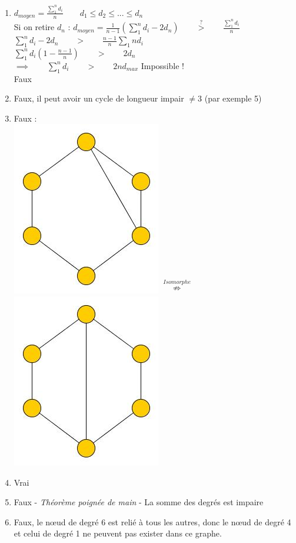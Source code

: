 \begin{solution}
\begin{enumerate}
\item{
$d_{moyen} = \frac{\sum_{1}^{n} d_{i}}{n} \qquad d_{1} \leq d_{2} \leq ... \leq d_{n}$\\
Si on retire $d_{n}$ :
$d_{moyen} = \frac{1}{n-1}  (\sum_{1}^{n} d_{i} -2d_{n}) \qquad \stackrel{?}{>} \qquad \frac{\sum_{1}^{n}  d_{i}}{n}$\\
$\sum_{1}^{n} d_{i} - 2d_{n} \qquad > \qquad \frac{n-1}{n} \sum_{1}{n} d_{i}$\\
$\sum_{1}^{n} d_{i}(1- \frac{n-1}{n}) \qquad > \qquad 2d_{n}$\\
$\implies \qquad \sum_{1}^{n} d_{i} \qquad > \qquad 2n d_{max}$ Impossible !\\
Faux
}
\item{Faux, il peut avoir un cycle de longueur impair $\neq3$ (par exemple 5)}
\item{Faux :\\  
\includegraphics[scale=0.3]{graph_ape1_ex1_3_1}
$ \stackrel{Isomorphe}{\nRightarrow}$
\includegraphics[scale=0.3]{graph_ape1_ex1_3_2}
}
\item{Vrai}
\item{Faux - \textit{Théorème poignée de main} - La somme des degrés est impaire}
\item{Faux, le nœud de degré 6 est relié à tous les autres, donc le nœud de degré 4 et celui de degré 1 ne peuvent pas exister dans ce graphe.}
\end{enumerate}
\end{solution}


